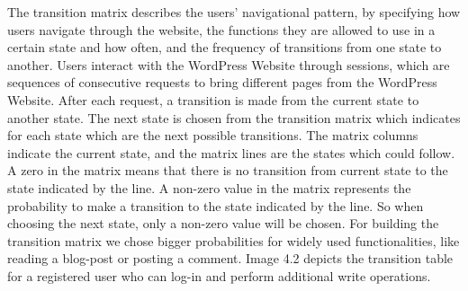 The transition matrix describes the users' navigational pattern, by specifying how users navigate through the website, the functions they are allowed to use in a certain state and how often, and the frequency of transitions from one state to another. Users interact with the WordPress Website through sessions, which are sequences of consecutive requests to bring different pages from the WordPress Website. After each request, a transition is made from the current state to another state. The next state is chosen from the transition matrix which indicates for each state which are the next possible transitions. The matrix columns indicate the current state, and the matrix lines are the states which could follow. A zero in the matrix means that there is no transition from current state to the state indicated by the line. A non-zero value in the matrix represents the probability to make a transition to the state indicated by the line. So when choosing the next state, only a non-zero value will be chosen. For building the transition matrix we chose bigger probabilities for widely used functionalities, like reading a blog-post or posting a comment. Image 4.2 depicts the transition table for a registered user who can log-in and perform additional write operations.



